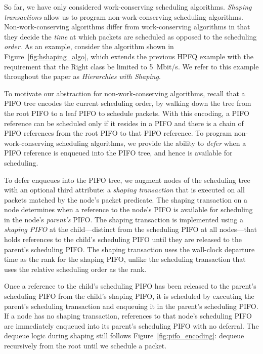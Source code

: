 So far, we have only considered work-conserving scheduling
algorithms. {\em Shaping transactions} allow us to program
non-work-conserving scheduling algorithms. Non-work-conserving
algorithms differ from work-conserving algorithms in that they decide
the {\em time} at which packets are scheduled as opposed to the
scheduling {\em order}. As an example, consider the algorithm shown in
Figure~\ref{fig:hshaping_algo}, which extends the previous HPFQ
example with the requirement that the Right class be limited to
5~Mbit/s. We refer to this example throughout the paper as {\em
  Hierarchies with Shaping}.


To motivate our abstraction for non-work-conserving algorithms, recall
that a PIFO tree encodes the current scheduling order, by walking down
the tree from the root PIFO to a leaf PIFO to schedule packets.  With
this encoding, a PIFO reference can be scheduled
only if it resides in a PIFO and there is a chain of PIFO references
from the root PIFO to that PIFO reference. To program non-work-conserving
scheduling algorithms, we provide the ability to {\em defer} when a
PIFO reference is enqueued into the PIFO tree, and hence is
available for scheduling.

To defer enqueues into the PIFO tree, we augment nodes of the
scheduling tree with an optional third attribute: a {\em shaping
  transaction} that is executed on all packets matched by the node's
packet predicate. The shaping transaction on a node determines when a
reference to the node's PIFO is available for scheduling in the node's
{\em parent's} PIFO. The shaping transaction is implemented using a
{\em shaping PIFO} at the child---distinct from the scheduling PIFO at
all nodes---that holds references to the child's scheduling PIFO until
they are released to the parent's scheduling PIFO.  The shaping
transaction uses the wall-clock departure time as the rank for the
shaping PIFO, unlike the scheduling transaction that uses the relative
scheduling order as the rank.

Once a reference to the child's scheduling PIFO has been released to
the parent's scheduling PIFO from the child's shaping PIFO, it is
scheduled by executing the parent's scheduling transaction and
enqueuing it in the parent's scheduling PIFO. If a node has no shaping
transaction, references to that node's scheduling PIFO are
immediately enqueued into its parent's scheduling PIFO with no deferral.
The dequeue logic during shaping still follows Figure~\ref{fig:pifo_encoding}:
dequeue recursively from the root until we schedule a packet.

